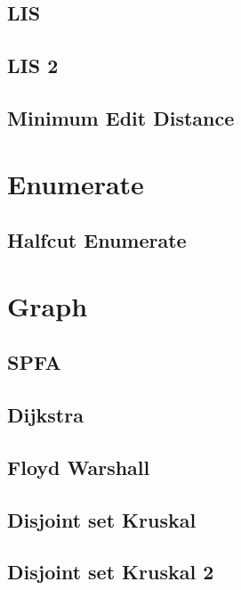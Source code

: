         \subsection{LIS}
                  
        \subsection{LIS 2}
                  
        \subsection{Minimum Edit Distance}
                  

\section{Enumerate} 
        \subsection{Halfcut Enumerate}
                

\section{Graph}
        \subsection{SPFA}
                
        \subsection{Dijkstra}
                
        \subsection{Floyd Warshall}
                
        \subsection{Disjoint set Kruskal}
                
        \subsection{Disjoint set Kruskal 2}
                
